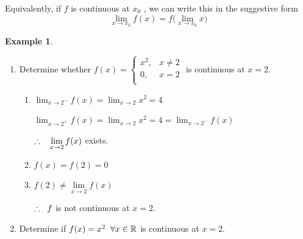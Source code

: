 \documentclass[11pt,a4paper]{article}
\theoremstyle{definition}
\newtheorem{exa}[thm]{Example}
\begin{document}
Equivalently, if $f$ is continuous at $x_0$ , we can write this in the suggestive form $$\lim_{x \rightarrow x_0} f(x) = f\Big(\lim\limits_{x \rightarrow x_0} x\Big)$$


\begin{exa}
\begin{enumerate}
\item Determine whether $f(x) = 
\begin{cases} 
x^2, & x \neq 2\\
0, & x = 2\\
\end{cases}
$ is continuous at $x = 2$.


\begin{figure}[H]
\centering
{}
\end{figure}

\begin{enumerate}
\item $\displaystyle{\lim_{x\rightarrow 2^-} f(x ) = \lim_{x\rightarrow 2}x^2 = 4}$

$\displaystyle{\lim_{x\rightarrow 2^+}f(x) = \lim_{x\rightarrow 2}x^2 = 4 = \lim_{x\rightarrow 2^-}f(x)}$

$\therefore\hspace{0.3cm} \lim\limits_{x \rightarrow 2}f(x)$ exists.

\item $f(x) = f(2) = 0$

\item $f(2) \neq \lim\limits_{x\rightarrow 2} f(x)$

$\therefore\hspace{0.2cm} f$ is not continuous at $x = 2$.
\end{enumerate}

\item Determine if $f(x) = x^2\hspace{0.2cm} \forall x \in \mathbb{R}$ is continuous at $x = 2$.


\end{enumerate}
\end{exa}
\end{document}
